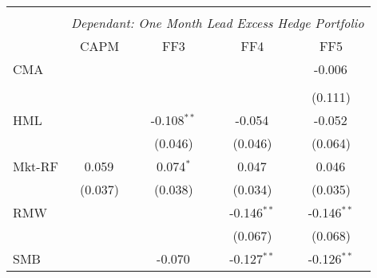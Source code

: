 \begin{table}[H] \centering
  \begin{tabular}{@{\extracolsep{5pt}}lcccc}
    \\[-1.8ex]\hline
    \hline                                                                                                                                                        \\[-1.8ex]
                      & \multicolumn{4}{c}{\textit{Dependant: One Month Lead Excess Hedge Portfolio}} \
    \cr \cline{2-5}
    \\[-1.8ex] & CAPM & FF3 & FF4 & FF5 \\
    \hline
    CMA               &                                                                                  &                   &                   & -0.006$^{}$    \\                                                                                                                                                    \\[-1.8ex]
                      &                                                                                  &                   &                   & (0.111)        \\
    HML               &                                                                                  & -0.108$^{**}$     & -0.054$^{}$       & -0.052$^{}$    \\
                      &                                                                                  & (0.046)           & (0.046)           & (0.064)        \\
    Mkt-RF            & 0.059$^{}$                                                                       & 0.074$^{*}$       & 0.047$^{}$        & 0.046$^{}$     \\
                      & (0.037)                                                                          & (0.038)           & (0.034)           & (0.035)        \\
    RMW               &                                                                                  &                   & -0.146$^{**}$     & -0.146$^{**}$  \\
                      &                                                                                  &                   & (0.067)           & (0.068)        \\
    SMB               &                                                                                  & -0.070$^{}$       & -0.127$^{**}$     & -0.126$^{**}$  \\

\end{tabular}
\end{table}
